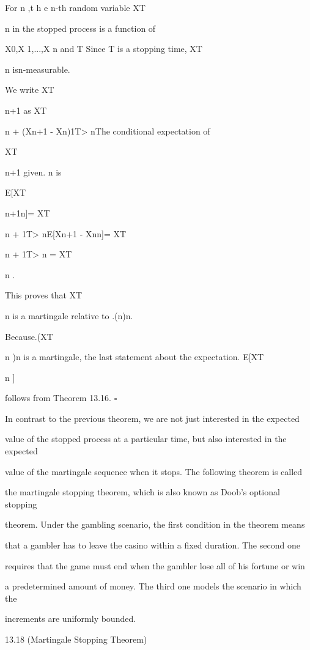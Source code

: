 {For n ,t h e n-th random variable XT

n in the stopped process is a function of

X0,X 1,...,X n and T Since T is a stopping time, XT

n isn-measurable.

We write XT

n+1 as XT

n + (Xn+1 - Xn)1{T> n}The conditional expectation of

XT

n+1 given. n is

E[XT

n+1\vert{}n]= XT

n + 1{T> n}E[Xn+1 - Xn\vert{}n]= XT

n + 1{T> n}  = XT

n .

This proves that XT

n is a martingale relative to .(n)n.

Because.(XT

n )n is a martingale, the last statement about the expectation. E[XT

n ]

follows from Theorem 13.16. \hfill $\square$

In contrast to the previous theorem, we are not just interested in the expected

value of the stopped process at a particular time, but also interested in the expected

value of the martingale sequence when it stops. The following theorem is called

the martingale stopping theorem, which is also known as Doob's optional stopping

theorem. Under the gambling scenario, the first condition in the theorem means

that a gambler has to leave the casino within a fixed duration. The second one

requires that the game must end when the gambler lose all of his fortune or win

a predetermined amount of money. The third one models the scenario in which the

increments are uniformly bounded.

\begin{thmbox}{13.18 (Martingale Stopping Theorem)}
\end{thmbox}

}
